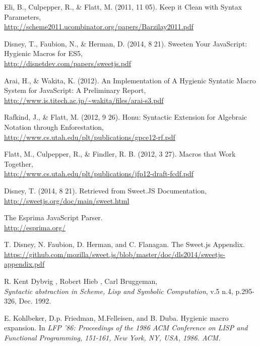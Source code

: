 %
%
%
%
\begin{thebibliography}{10}

 Eli, B., Culpepper, R., \& Flatt, M. (2011, 11 05). Keep it Clean with Syntax Parameters,\\
\url{http://scheme2011.ucombinator.org/papers/Barzilay2011.pdf}

 Disney, T., Faubion, N., \& Herman, D. (2014, 8 21). Sweeten Your JavaScript: Hygienic Macros for ES5,\\
\url{http://disnetdev.com/papers/sweetjs.pdf}

 Arai, H., \& Wakita, K. (2012). An Implementation of A Hygienic Syntatic Macro System for JavaScript: A Preliminary Report,\\
\url{http://www.is.titech.ac.jp/~wakita/files/arai-s3.pdf}

 Rafkind, J., \& Flatt, M. (2012, 9 26). Honu: Syntactic Extension for Algebraic Notation through Enforestation,\\
\url{http://www.cs.utah.edu/plt/publications/gpce12-rf.pdf}

 Flatt, M., Culpepper, R., \& Findler, R. B. (2012, 3 27). Macros that Work Together,\\
\url{http://www.cs.utah.edu/plt/publications/jfp12-draft-fcdf.pdf}

 Disney, T. (2014, 8 21). Retrieved from Sweet.JS Documentation,\\
\url{http://sweetjs.org/doc/main/sweet.html}

 The Esprima JavaScript Parser.\\
\url{http://esprima.org/}

T. Disney, N. Faubion, D. Herman, and C. Flanagan. The Sweet.js Appendix.\\
\url{https://github.com/mozilla/sweet.js/blob/master/doc/dls2014/sweetjs-appendix.pdf}

R. Kent Dybvig , Robert Hieb , Carl Bruggeman,\\ {\it Syntactic abstraction in Scheme, Lisp and Symbolic Computation}, v.5 n.4, p.295-326, Dec. 1992.

 E. Kohlbeker, D.p. Friedman, M.Felleisen, and B. Duba. Hygienic macro expansion. In {\it LFP '86: Proceedings of the 1986 ACM Conference on LISP and Functional Programming, 151-161, New York, NY, USA, 1986. ACM.}


\end{thebibliography}

